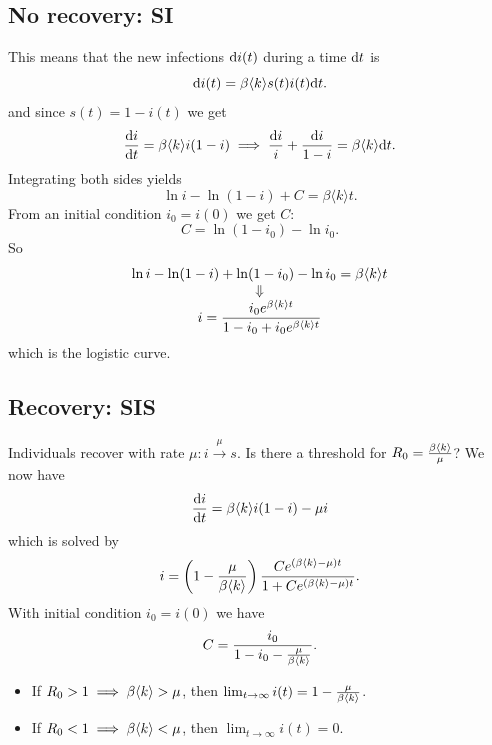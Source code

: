 \documentclass[a4paper,9pt]{extarticle}
\begin{document}
\begin{multicols*}{2}
	\subsection{No recovery: SI}
	This means that the new infections $\mathrm{d} i(t)$ during a time $\mathrm{d} t$ is
	\begin{equation*}
		\mathrm{d} i(t)=\beta\langle k\rangle s(t)i(t)\mathrm{d} t.
	\end{equation*}
	and since $s(t)=1-i(t)$ we get
	\begin{equation*}
		\frac{\mathrm{d} i}{\mathrm{d} t}=\beta\langle k\rangle i(1-i)\implies\frac{\mathrm{d} i}{i}+\frac{\mathrm{d} i}{1-i}=\beta\langle k\rangle\mathrm{d} t.
	\end{equation*}
	Integrating both sides yields
	\begin{equation*}
		\ln i-\ln(1-i)+C=\beta\langle k\rangle t.
	\end{equation*}
	From an initial condition $i_{0}=i(0)$ we get $C$:
	\begin{equation*}
		C=\ln(1-i_{0})-\ln i_{0}.
	\end{equation*}
	So
	\begin{equation*}
			\begin{array}{>{\displaystyle}c}
				\ln i-\ln(1-i)+\ln(1-i_{0})-\ln i_{0}=\beta\langle k\rangle t\\
				\Downarrow\\
				i=\frac{i_{0}e^{\beta\ang{k}t}}{1-i_{0}+i_{0}e^{\beta\ang{k}{t}}}
			\end{array}
	\end{equation*}
	which is the logistic curve.
	\subsection{Recovery: SIS}
	Individuals recover with rate $\mu:i\xrightarrow{\mu}s$. Is there a threshold for $R_{0}=\frac{\beta\langle k \rangle}{\mu}$? We now have
	\begin{equation*}
		\frac{\mathrm{d} i}{\mathrm{d} t}=\beta\langle k \rangle i(1-i)-\mu i
	\end{equation*}
	which is solved by
	\begin{equation*}
		i=\left(1-\frac{\mu}{\beta\langle k \rangle}\right)\frac{Ce^{(\beta\langle k \rangle-\mu)t}}{1+Ce^{\left(\beta\langle k \rangle-\mu\right)t}}.
	\end{equation*}
	With initial condition $i_{0}=i(0)$ we have
	\begin{equation*}
		C=\frac{i_{0}}{1-i_{0}-\frac{\mu}{\beta\langle k \rangle}}.
	\end{equation*}
	\begin{itemize}
		\item If $R_{0}>1\implies \beta\langle k \rangle>\mu$, then $\lim_{t\to\infty}i(t)=1-\frac{\mu}{\beta\langle k \rangle}$.
		\item If $R_{0}<1\implies \beta\langle k \rangle<\mu$, then $\lim_{t\to\infty}i(t)=0$.
	\end{itemize}

\end{multicols*}
\end{document}
